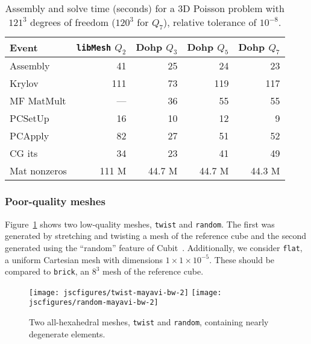 \begin{table}
  \centering
  \begin{tabular}{l rrrr}
    \toprule
    Event        & \texttt{libMesh} $Q_2$ & Dohp $Q_3$ & Dohp $Q_5$ & Dohp $Q_7$ \\
    \midrule
    Assembly     & 41            & 25         & 24         & 23         \\
    Krylov       & 111           & 73         & 119        & 117        \\
    MF MatMult   & ---           & 36         & 55         & 55         \\
    PCSetUp      & 16            & 10         & 12         & 9          \\
    PCApply      & 82            & 27         & 51         & 52         \\
    \midrule
    CG its       & 34            & 23         & 41         & 49         \\
    Mat nonzeros & 111 M         & 44.7 M     & 44.7 M     & 44.3 M     \\
    \bottomrule
  \end{tabular}
  \caption{Assembly and solve time (seconds) for a 3D Poisson problem with $121^3$ degrees of freedom ($120^3$ for
    $Q_7$), relative tolerance of $10^{-8}$.}\label{tab:libmesh}
\end{table}

\subsubsection{Poor-quality meshes}
Figure~\ref{fig:quality} shows two low-quality meshes, \texttt{twist} and \texttt{random}.  The first was generated by
stretching and twisting a mesh of the reference cube and the second generated using the ``random'' feature of
Cubit~\citep{blacker1994cmg}.  Additionally, we consider \texttt{flat}, a uniform Cartesian mesh with dimensions $1\times
1 \times 10^{-5}$.  These should be compared to \texttt{brick}, an $8^3$ mesh of the reference cube.

\begin{figure}
  \centering
  \texttt{[image: jscfigures/twist-mayavi-bw-2]}
  \texttt{[image: jscfigures/random-mayavi-bw-2]}
  \caption{Two all-hexahedral meshes, \texttt{twist} and \texttt{random}, containing nearly degenerate elements.
    }
  \label{fig:quality}
\end{figure}

